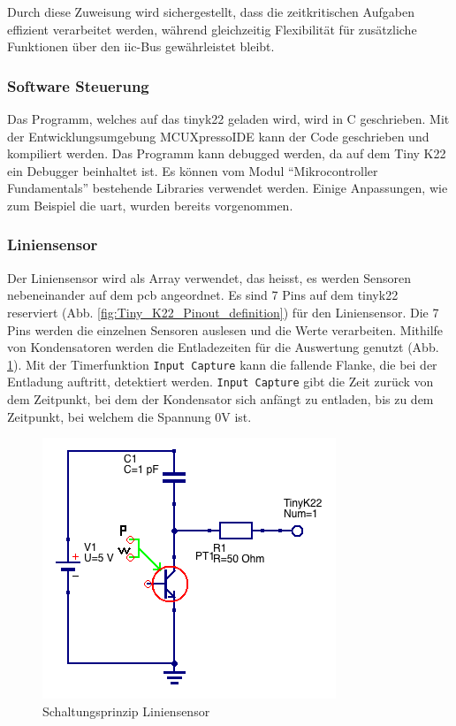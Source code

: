 Durch diese Zuweisung wird sichergestellt, dass die zeitkritischen Aufgaben effizient verarbeitet werden, während gleichzeitig Flexibilität für zusätzliche Funktionen über den \acrshort{iic}-Bus gewährleistet bleibt.

\subsubsection*{Software Steuerung}


Das Programm, welches auf das \gls{tinyk22} geladen wird, wird in C geschrieben. Mit der Entwicklungsumgebung MCUXpressoIDE kann der Code geschrieben und kompiliert werden. Das Programm kann debugged werden, da auf dem Tiny K22 ein Debugger beinhaltet ist. Es können vom Modul ``Mikrocontroller Fundamentals'' bestehende Libraries verwendet werden. Einige Anpassungen, wie zum Beispiel die \acrshort{uart}, wurden bereits vorgenommen.

\subsubsection*{Liniensensor}


Der Liniensensor wird als Array verwendet, das heisst, es werden Sensoren nebeneinander auf dem \acrshort{pcb} angeordnet. Es sind 7 Pins auf dem \gls{tinyk22} reserviert (Abb. \ref{fig:Tiny_K22_Pinout_definition}) für den Liniensensor. Die 7 Pins werden die einzelnen Sensoren auslesen und die Werte verarbeiten. Mithilfe von Kondensatoren werden die Entladezeiten für die Auswertung genutzt (Abb. \ref{fig:Liniensensor_Schaltung}). Mit der Timerfunktion \verb|Input Capture| kann die fallende Flanke, die bei der Entladung auftritt, detektiert werden. \verb|Input Capture| gibt die Zeit zurück von dem Zeitpunkt, bei dem der Kondensator sich anfängt zu entladen, bis zu dem Zeitpunkt, bei welchem die Spannung 0V ist.

\begin{figure}[H]
    \centering
    \includegraphics[width=0.4\linewidth]{img/Liniensensor_Schaltung.png}
    \caption{Schaltungsprinzip Liniensensor}
    \label{fig:Liniensensor_Schaltung}
\end{figure}

